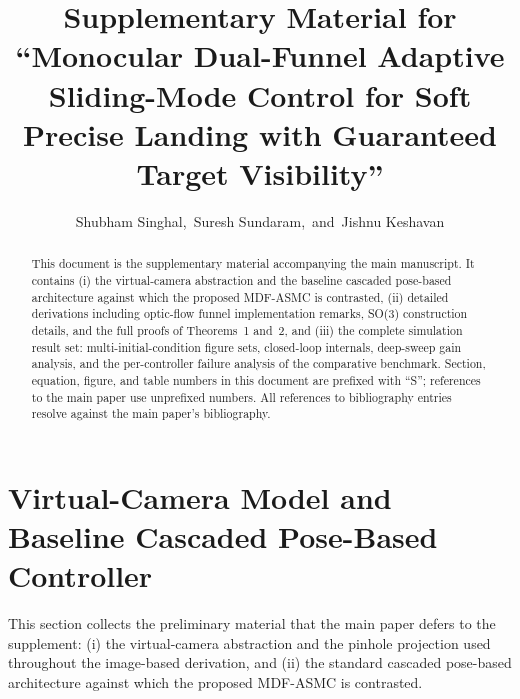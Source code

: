\documentclass[10pt,journal]{IEEEtran}
\title{Supplementary Material for\\``Monocular Dual-Funnel Adaptive Sliding-Mode Control for Soft Precise Landing with Guaranteed Target Visibility''}
\author{Shubham Singhal,~Suresh Sundaram,~and~Jishnu Keshavan}
\begin{document}
\maketitle

\begin{abstract}
This document is the supplementary material accompanying the main manuscript. It contains (i) the virtual-camera abstraction and the baseline cascaded pose-based architecture against which the proposed MDF-ASMC is contrasted, (ii) detailed derivations including optic-flow funnel implementation remarks, SO(3) construction details, and the full proofs of Theorems~1 and~2, and (iii) the complete simulation result set: multi-initial-condition figure sets, closed-loop internals, deep-sweep gain analysis, and the per-controller failure analysis of the comparative benchmark. Section, equation, figure, and table numbers in this document are prefixed with ``S''; references to the main paper use unprefixed numbers. All references to bibliography entries resolve against the main paper's bibliography.
\end{abstract}

\section{Virtual-Camera Model and Baseline Cascaded Pose-Based Controller}
\label{sup:baseline}
This section collects the preliminary material that the main paper defers to the supplement: (i) the virtual-camera abstraction and the pinhole projection used throughout the image-based derivation, and (ii) the standard cascaded pose-based architecture against which the proposed MDF-ASMC is contrasted.
\end{document}

